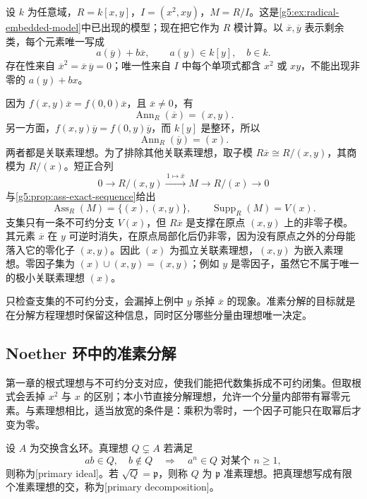 \begin{example}\label{g5:exm:associated-embedded-point}
	设 \(k\) 为任意域，\(R=k[x,y]\)，\(I=(x^2,xy)\)，\(M=R/I\)。这是\cref{g5:ex:radical-embedded-model}中已出现的模型；现在把它作为 \(R\) 模计算。以 \(\overline x,\overline y\) 表示剩余类，每个元素唯一写成
	\[
		a(\overline y)+b\overline x,\qquad a(y)\in k[y],\quad b\in k.
	\]
	存在性来自 \(\overline x^2=\overline x\,\overline y=0\)；唯一性来自 \(I\) 中每个单项式都含 \(x^2\) 或 \(xy\)，不能出现非零的 \(a(y)+bx\)。

	因为 \(f(x,y)\overline x=f(0,0)\overline x\)，且 \(\overline x\ne0\)，有
	\[
		\operatorname{Ann}_R(\overline x)=(x,y).
	\]
	另一方面，\(f(x,y)\overline y=f(0,y)\overline y\)，而 \(k[y]\) 是整环，所以
	\[
		\operatorname{Ann}_R(\overline y)=(x).
	\]
	两者都是关联素理想。为了排除其他关联素理想，取子模 \(R\overline x\cong R/(x,y)\)，其商模为 \(R/(x)\)。短正合列
	\[
		0\longrightarrow R/(x,y)\xrightarrow{\,1\mapsto\overline x\,}M
		\longrightarrow R/(x)\longrightarrow0
	\]
	与\cref{g5:prop:ass-exact-sequence}给出
	\[
		\operatorname{Ass}_R(M)=\{(x),(x,y)\},\qquad
		\operatorname{Supp}_R(M)=V(x).
	\]
	支集只有一条不可约分支 \(V(x)\)，但 \(R\overline x\) 是支撑在原点 \((x,y)\) 上的非零子模。其元素 \(\overline x\) 在 \(y\) 可逆时消失，在原点局部化后仍非零，因为没有原点之外的分母能落入它的零化子 \((x,y)\)。因此 \((x)\) 为孤立关联素理想，\((x,y)\) 为嵌入素理想。零因子集为 \((x)\cup(x,y)=(x,y)\)；例如 \(y\) 是零因子，虽然它不属于唯一的极小关联素理想 \((x)\)。
\end{example}

只检查支集的不可约分支，会漏掉上例中 \(y\) 杀掉 \(\overline x\) 的现象。准素分解的目标就是在分解方程理想时保留这种信息，同时区分哪些分量由理想唯一决定。

\subsection{Noether 环中的准素分解}
\label{g5:subsec:0204:04}
第一章的根式理想与不可约分支对应，使我们能把代数集拆成不可约闭集。但取根式会丢掉 \(x^2\) 与 \(x\) 的区别；本小节直接分解理想，允许一个分量内部带有幂零元素。与素理想相比，适当放宽的条件是：乘积为零时，一个因子可能只在取幂后才变为零。

\begin{definition}\label{g5:def:primary-ideal}
	设 \(A\) 为交换含幺环。真理想 \(Q\subsetneq A\) 若满足
	\[
		ab\in Q,\quad b\notin Q
		\quad\Longrightarrow\quad a^n\in Q\text{ 对某个 }n\ge1,
	\]
	则称为[primary ideal]。若 \(\sqrt Q=\mathfrak p\)，则称 \(Q\) 为 \(\mathfrak p\) 准素理想。把真理想写成有限个准素理想的交，称为[primary decomposition]。
\end{definition}

